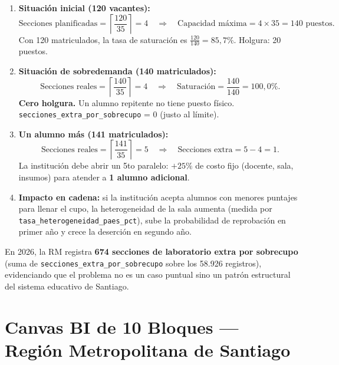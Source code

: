 \documentclass[11pt,a4paper]{article}
\begin{document}
\begin{tcolorbox}[colback=lightbg, colframe=primaryblue, breakable,
    title=\textbf{Caso: Ingeniería Civil Industrial en la RM (módulo laboratorio = 35 puestos)}]
\begin{enumerate}[leftmargin=*]
    \item \textbf{Situación inicial (120 vacantes):}
          \[\text{Secciones planificadas} = \left\lceil \frac{120}{35} \right\rceil = 4
          \quad \Rightarrow \quad \text{Capacidad máxima} = 4 \times 35 = 140\text{ puestos}.\]
          Con 120 matriculados, la tasa de saturación es
          $\frac{120}{140} = 85{,}7\%$. Holgura: 20 puestos.
    \item \textbf{Situación de sobredemanda (140 matriculados):}
          \[\text{Secciones reales} = \left\lceil \frac{140}{35} \right\rceil = 4
          \quad \Rightarrow \quad \text{Saturación} = \frac{140}{140} = 100{,}0\%.\]
          \textbf{Cero holgura.} Un alumno repitente no tiene puesto físico. \texttt{secciones\_extra\_por\_sobrecupo} = 0 (justo al límite).
    \item \textbf{Un alumno más (141 matriculados):}
          \[\text{Secciones reales} = \left\lceil \frac{141}{35} \right\rceil = 5
          \quad \Rightarrow \quad \text{Secciones extra} = 5 - 4 = 1.\]
          La institución debe abrir un 5to paralelo: $+25\%$ de costo fijo
          (docente, sala, insumos) para atender a \textbf{1 alumno adicional}.
    \item \textbf{Impacto en cadena:}
          si la institución acepta alumnos con menores puntajes para llenar el cupo,
          la heterogeneidad de la sala aumenta (medida por
          \texttt{tasa\_heterogeneidad\_paes\_pct}), sube la probabilidad de
          reprobación en primer año y crece la deserción en segundo año.
\end{enumerate}
\end{tcolorbox}

\noindent
En 2026, la RM registra \textbf{674 secciones de laboratorio extra por sobrecupo}
(suma de \texttt{secciones\_extra\_por\_sobrecupo} sobre los 58.926 registros),
evidenciando que el problema no es un caso puntual sino un patrón estructural
del sistema educativo de Santiago.

\section{Canvas BI de 10 Bloques — Región Metropolitana de Santiago}
\label{sec:canvas}
\end{document}
